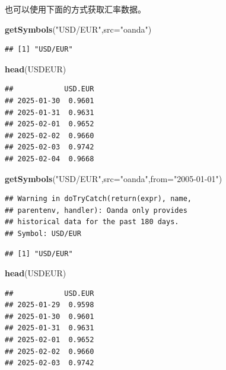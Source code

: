 \documentclass[]{ctexbook}
\newenvironment{Shaded}{\begin{snugshade}}{\end{snugshade}}
\newcommand{\AttributeTok}[1]{\textcolor[rgb]{0.13,0.29,0.53}{#1}}
\newcommand{\FunctionTok}[1]{\textcolor[rgb]{0.13,0.29,0.53}{\textbf{#1}}}
\newcommand{\NormalTok}[1]{#1}
\newcommand{\StringTok}[1]{\textcolor[rgb]{0.31,0.60,0.02}{#1}}
\begin{document}
也可以使用下面的方式获取汇率数据。

\begin{Shaded}
\begin{Highlighting}[]
\FunctionTok{getSymbols}\NormalTok{(}\StringTok{"USD/EUR"}\NormalTok{,}\AttributeTok{src=}\StringTok{"oanda"}\NormalTok{)}
\end{Highlighting}
\end{Shaded}

\begin{verbatim}
## [1] "USD/EUR"
\end{verbatim}

\begin{Shaded}
\begin{Highlighting}[]
\FunctionTok{head}\NormalTok{(USDEUR)}
\end{Highlighting}
\end{Shaded}

\begin{verbatim}
##            USD.EUR
## 2025-01-30  0.9601
## 2025-01-31  0.9631
## 2025-02-01  0.9652
## 2025-02-02  0.9660
## 2025-02-03  0.9742
## 2025-02-04  0.9668
\end{verbatim}

\begin{Shaded}
\begin{Highlighting}[]
\FunctionTok{getSymbols}\NormalTok{(}\StringTok{"USD/EUR"}\NormalTok{,}\AttributeTok{src=}\StringTok{"oanda"}\NormalTok{,}\AttributeTok{from=}\StringTok{"2005{-}01{-}01"}\NormalTok{)}
\end{Highlighting}
\end{Shaded}

\begin{verbatim}
## Warning in doTryCatch(return(expr), name,
## parentenv, handler): Oanda only provides
## historical data for the past 180 days.
## Symbol: USD/EUR
\end{verbatim}

\begin{verbatim}
## [1] "USD/EUR"
\end{verbatim}

\begin{Shaded}
\begin{Highlighting}[]
\FunctionTok{head}\NormalTok{(USDEUR)}
\end{Highlighting}
\end{Shaded}

\begin{verbatim}
##            USD.EUR
## 2025-01-29  0.9598
## 2025-01-30  0.9601
## 2025-01-31  0.9631
## 2025-02-01  0.9652
## 2025-02-02  0.9660
## 2025-02-03  0.9742
\end{verbatim}
\end{document}
